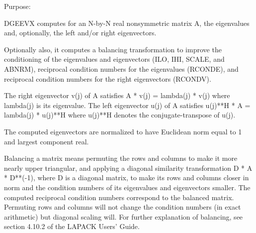  \begin{DoxyParagraph}{Purpose\+: }
\begin{DoxyVerb} DGEEVX computes for an N-by-N real nonsymmetric matrix A, the
 eigenvalues and, optionally, the left and/or right eigenvectors.

 Optionally also, it computes a balancing transformation to improve
 the conditioning of the eigenvalues and eigenvectors (ILO, IHI,
 SCALE, and ABNRM), reciprocal condition numbers for the eigenvalues
 (RCONDE), and reciprocal condition numbers for the right
 eigenvectors (RCONDV).

 The right eigenvector v(j) of A satisfies
                  A * v(j) = lambda(j) * v(j)
 where lambda(j) is its eigenvalue.
 The left eigenvector u(j) of A satisfies
               u(j)**H * A = lambda(j) * u(j)**H
 where u(j)**H denotes the conjugate-transpose of u(j).

 The computed eigenvectors are normalized to have Euclidean norm
 equal to 1 and largest component real.

 Balancing a matrix means permuting the rows and columns to make it
 more nearly upper triangular, and applying a diagonal similarity
 transformation D * A * D**(-1), where D is a diagonal matrix, to
 make its rows and columns closer in norm and the condition numbers
 of its eigenvalues and eigenvectors smaller.  The computed
 reciprocal condition numbers correspond to the balanced matrix.
 Permuting rows and columns will not change the condition numbers
 (in exact arithmetic) but diagonal scaling will.  For further
 explanation of balancing, see section 4.10.2 of the LAPACK
 Users' Guide.\end{DoxyVerb}
 
\end{DoxyParagraph}

